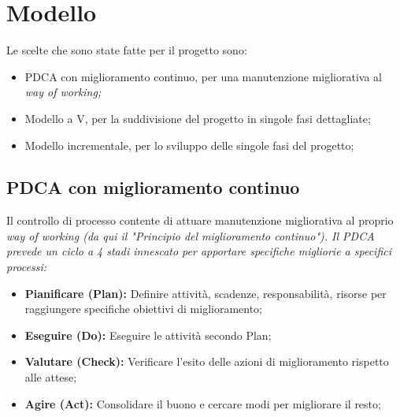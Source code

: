 \chapter{Modello}
Le scelte che sono state fatte per il progetto sono:
\begin{itemize}
    \item PDCA con miglioramento continuo, per una manutenzione migliorativa al \it{way of working};
    \item Modello a V, per la suddivisione del progetto in singole fasi dettagliate;
    \item Modello incrementale, per lo sviluppo delle singole fasi del progetto;
\end{itemize}

\section{PDCA con miglioramento continuo}
Il controllo di processo contente di attuare manutenzione migliorativa al proprio \it{way of working} (da qui il "Principio del miglioramento continuo"). Il PDCA prevede un ciclo a 4 stadi innescato per apportare specifiche migliorie a specifici processi:
\begin{itemize}
    \item \textbf{Pianificare (Plan):} Definire attività, scadenze, responsabilità, risorse per raggiungere
    specifiche obiettivi di miglioramento; 
    \item \textbf{Eseguire (Do):} Eseguire le attività secondo Plan; 
    \item \textbf{Valutare (Check):} Verificare l’esito delle azioni di miglioramento rispetto alle attese;
    \item \textbf{Agire (Act):} Consolidare il buono e cercare modi per migliorare il resto;
\end{itemize}

